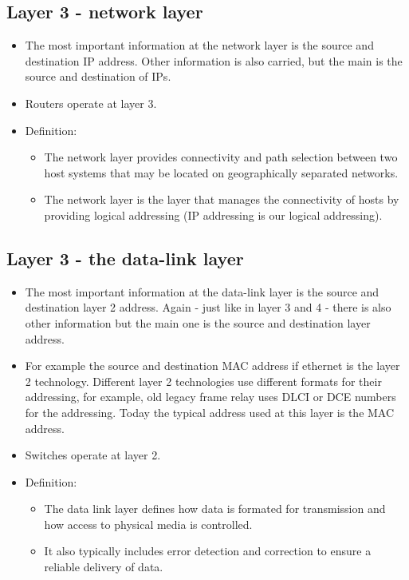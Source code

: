 \subsection{Layer 3 - network layer}
\begin{itemize}
    \item The most important information at the network layer is the source and destination IP address. Other information is also carried, but the main is the source and destination of IPs.
    \item Routers operate at layer 3.
    \item Definition: 
        \begin{itemize}
            \item The network layer provides connectivity and path selection between two host systems that may be located on geographically separated networks. 
            \item The network layer is the layer that manages the connectivity of hosts by providing logical addressing (IP addressing is our logical addressing).
        \end{itemize}
\end{itemize}

\subsection{Layer 3 - the data-link layer}
\begin{itemize}
    \item The most important information at the data-link layer is the source and destination layer 2 address. Again - just like in layer 3 and 4 - there is also other information but the main one is the source and destination layer address.
    \item For example the source and destination MAC address if ethernet is the layer 2 technology. Different layer 2 technologies use different formats for their addressing, for example, old legacy frame relay uses DLCI or DCE numbers for the addressing. Today the typical address used at this layer is the MAC address.
    \item Switches operate at layer 2.
    \item Definition:
        \begin{itemize}
            \item The data link layer defines how data is formated for transmission and how access to physical media is controlled.
            \item It also typically includes error detection and correction to ensure a reliable delivery of data.
        \end{itemize}
\end{itemize}


